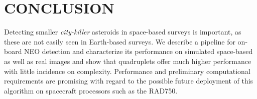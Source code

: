 \documentclass{article}
\begin{document}
\vspace{-0.3cm}
\section{CONCLUSION}
Detecting smaller {\em city-killer} asteroids in space-based surveys is important, as these  are not easily seen in Earth-based surveys. We describe a pipeline for on-board NEO detection and characterize its performance on simulated space-based as well as real images and show that quadruplets offer much higher performance with little incidence on complexity. Performance and preliminary computational requirements are promising with regard to the possible future deployment of this algorithm on spacecraft processors such as the RAD750. 

%






\newpage
%
\end{document}
